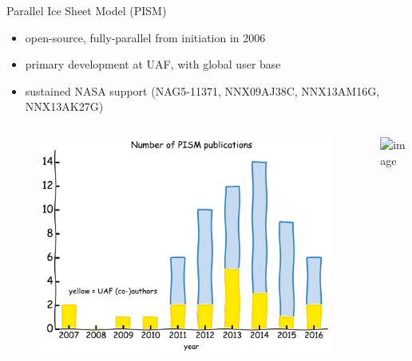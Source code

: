 \documentclass[hide notes,intlimits]{beamer}
\begin{document}
\begin{frame}{Parallel Ice Sheet Model (PISM)}
  \begin{itemize}
  \item open-source, fully-parallel from initiation in 2006
  \item primary development at UAF, with global user base
  \item sustained NASA support \tiny (NAG5-11371, NNX09AJ38C, NNX13AM16G, NNX13AK27G)
  \end{itemize}
  \begin{columns}
    \column[c]{4.75cm}
    \begin{figure}
      \includegraphics[width=\textwidth]{pism-uaf-publications}
    \end{figure}
    \column[c]{6.25cm}
    \includegraphics<1>[width=\textwidth]{pism-users}
  \end{columns}
\end{frame}
\end{document}
